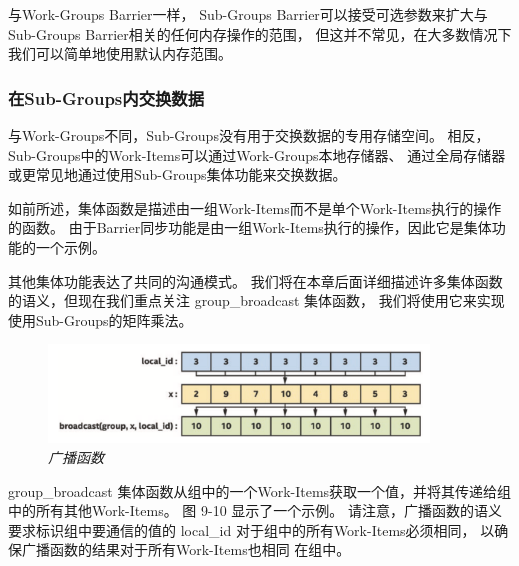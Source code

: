 与Work-Groups Barrier一样，
Sub-Groups Barrier可以接受可选参数来扩大与Sub-Groups Barrier相关的任何内存操作的范围，
但这并不常见，在大多数情况下我们可以简单地使用默认内存范围。

\subsubsection{在Sub-Groups内交换数据}
与Work-Groups不同，Sub-Groups没有用于交换数据的专用存储空间。 
相反，Sub-Groups中的Work-Items可以通过Work-Groups本地存储器、
通过全局存储器或更常见地通过使用Sub-Groups集体功能来交换数据。

如前所述，集体函数是描述由一组Work-Items而不是单个Work-Items执行的操作的函数。 
由于Barrier同步功能是由一组Work-Items执行的操作，因此它是集体功能的一个示例。

其他集体功能表达了共同的沟通模式。 
我们将在本章后面详细描述许多集体函数的语义，但现在我们重点关注 group\_broadcast 集体函数，
我们将使用它来实现使用Sub-Groups的矩阵乘法。

\begin{figure}[H]
	\centering
	\includegraphics[width=0.9\textwidth]{figs/F9.10.png}
	\caption{\textit{广播函数 }}
\end{figure}

group\_broadcast 集体函数从组中的一个Work-Items获取一个值，并将其传递给组中的所有其他Work-Items。 
图 9-10 显示了一个示例。 
请注意，广播函数的语义要求标识组中要通信的值的 local\_id 对于组中的所有Work-Items必须相同，
以确保广播函数的结果对于所有Work-Items也相同 在组中。

